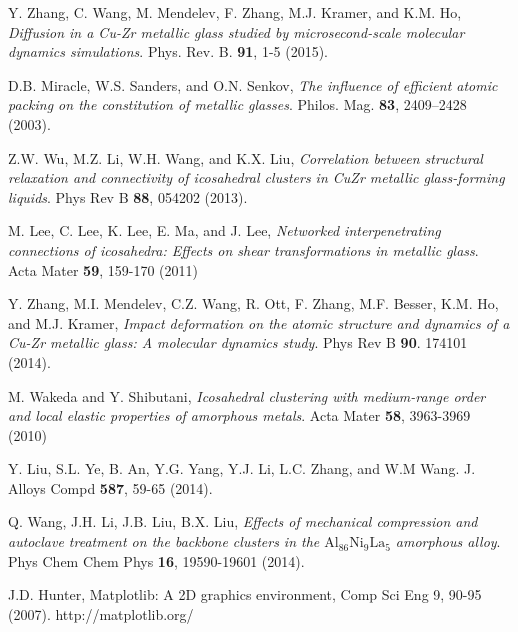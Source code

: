 \documentclass[aps,prl,preprint,showpacs,amsmath,floatfix,superscriptaddress]{revtex4}
\begin{document}
\begin{thebibliography}{}
Y. Zhang, C. Wang, M. Mendelev, F. Zhang, M.J. Kramer, and K.M. Ho, \textit{Diffusion in a Cu-Zr metallic glass studied by microsecond-scale molecular dynamics simulations}.
Phys. Rev. B. \textbf{91}, 1-5 (2015).

D.B. Miracle, W.S. Sanders, and O.N. Senkov, \textit{The influence of efficient atomic packing on the constitution of metallic glasses}. Philos. Mag. \textbf{83}, 2409–2428 (2003).

Z.W. Wu, M.Z. Li, W.H. Wang, and K.X. Liu, \textit{Correlation between structural relaxation and connectivity of icosahedral clusters in CuZr metallic glass-forming liquids}. Phys Rev B \textbf{88}, 054202 (2013).

M. Lee, C. Lee, K. Lee, E. Ma, and J. Lee, \textit{Networked interpenetrating connections of icosahedra: Effects on shear transformations in metallic glass}. Acta Mater \textbf{59}, 159-170 (2011)

Y. Zhang, M.I. Mendelev, C.Z. Wang, R. Ott, F. Zhang, M.F. Besser, K.M. Ho, and M.J. Kramer, \textit{Impact deformation on the atomic structure and dynamics of a Cu-Zr metallic glass: A molecular dynamics study}. Phys Rev B \textbf{90}. 174101 (2014).


M. Wakeda and Y. Shibutani, \textit{Icosahedral clustering with medium-range order and local elastic properties of amorphous metals}. Acta Mater \textbf{58}, 3963-3969 (2010)

Y. Liu, S.L. Ye, B. An, Y.G. Yang, Y.J. Li, L.C. Zhang, and W.M Wang. J. Alloys Compd \textbf{587}, 59-65 (2014).


Q. Wang, J.H. Li, J.B. Liu, B.X. Liu, \textit{Effects of mechanical compression and autoclave treatment on the backbone clusters in the $\mathrm{Al_{86}Ni_{9}La_{5}}$ amorphous alloy}. Phys Chem Chem Phys \textbf{16}, 19590-19601 (2014).

J.D. Hunter, Matplotlib: A 2D graphics environment, Comp Sci Eng 9, 90-95 (2007). http://matplotlib.org/

\end{thebibliography}
\end{document}

